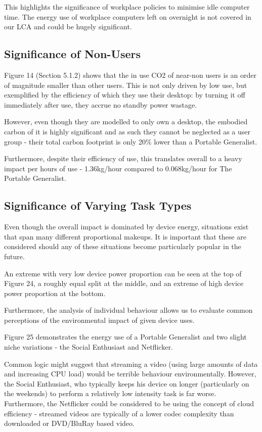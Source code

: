 \documentclass[conference]{IEEEtran}
\begin{document}
This highlights the significance of workplace policies to minimise
idle computer time. The energy use of workplace computers left on
overnight is not covered in our LCA and could be hugely significant.

\subsection{Significance of Non-Users}

Figure 14 (Section 5.1.2) shows that the in use CO2 of near-non users
is an order of magnitude smaller than other users. This is not only
driven by low use, but exemplified by the efficiency of which they use
their desktop: by turning it off immediately after use, they accrue no
standby power wastage.

However, even though they are modelled to only own a desktop, the
embodied carbon of it is highly significant and as such they cannot be
neglected as a user group - their total carbon footprint is only 20\%
lower than a Portable Generalist.

Furthermore, despite their efficiency of use, this translates overall
to a heavy impact per hours of use - 1.36kg/hour compared to
0.068kg/hour for The Portable Generalist.

\subsection{Significance of Varying Task Types}

Even though the overall impact is dominated by device energy,
situations exist that span many different proportional makeups. It is
important that these are considered should any of these situations
become particularly popular in the future.

An extreme with very low device power proportion can be seen at the
top of Figure 24, a roughly equal split at the middle, and an extreme
of high device power proportion at the bottom.

Furthermore, the analysis of individual behaviour allows us to
evaluate common perceptions of the environmental impact of given
device uses.

Figure 25 demonstrates the energy use of a Portable Generalist and two
slight niche variations - the Social Enthusiast and Netflicker.

Common logic might suggest that streaming a video (using large amounts
of data and increasing CPU load) would be terrible behaviour
environmentally. However, the Social Enthusiast, who typically keeps
his device on longer (particularly on the weekends) to perform a
relatively low intensity task is far worse. Furthermore, the
Netflicker could be considered to be using the concept of cloud
efficiency - streamed videos are typically of a lower codec complexity
than downloaded or DVD/BluRay based video.
\end{document}
